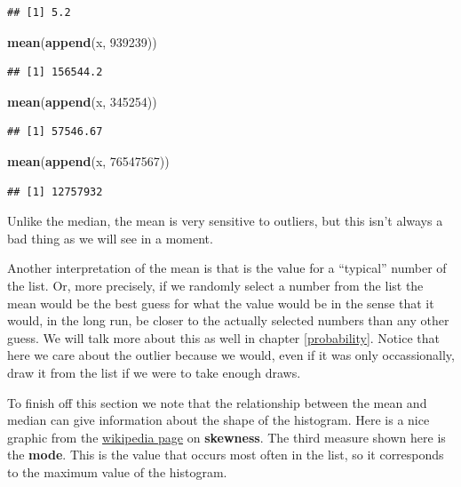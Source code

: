 \documentclass[]{book}
\newenvironment{Shaded}{\begin{snugshade}}{\end{snugshade}}
\newcommand{\DecValTok}[1]{\textcolor[rgb]{0.00,0.00,0.81}{#1}}
\newcommand{\KeywordTok}[1]{\textcolor[rgb]{0.13,0.29,0.53}{\textbf{#1}}}
\newcommand{\NormalTok}[1]{#1}
\begin{document}
\begin{verbatim}
## [1] 5.2
\end{verbatim}

\begin{Shaded}
\begin{Highlighting}[]
\KeywordTok{mean}\NormalTok{(}\KeywordTok{append}\NormalTok{(x, }\DecValTok{939239}\NormalTok{))}
\end{Highlighting}
\end{Shaded}

\begin{verbatim}
## [1] 156544.2
\end{verbatim}

\begin{Shaded}
\begin{Highlighting}[]
\KeywordTok{mean}\NormalTok{(}\KeywordTok{append}\NormalTok{(x, }\DecValTok{345254}\NormalTok{))}
\end{Highlighting}
\end{Shaded}

\begin{verbatim}
## [1] 57546.67
\end{verbatim}

\begin{Shaded}
\begin{Highlighting}[]
\KeywordTok{mean}\NormalTok{(}\KeywordTok{append}\NormalTok{(x, }\DecValTok{76547567}\NormalTok{))}
\end{Highlighting}
\end{Shaded}

\begin{verbatim}
## [1] 12757932
\end{verbatim}

Unlike the median, the mean is very sensitive to outliers, but this isn't always a bad thing as we will see in a moment.

Another interpretation of the mean is that is the value for a ``typical'' number of the list. Or, more precisely, if we randomly select a number from the list the mean would be the best guess for what the value would be in the sense that it would, in the long run, be closer to the actually selected numbers than any other guess. We will talk more about this as well in chapter \ref{probability}. Notice that here we care about the outlier because we would, even if it was only occassionally, draw it from the list if we were to take enough draws.

To finish off this section we note that the relationship between the mean and median can give information about the shape of the histogram. Here is a nice graphic from the \href{https://en.wikipedia.org/wiki/Skewness}{wikipedia page} on \textbf{skewness}.
The third measure shown here is the \textbf{mode}. This is the value that occurs most often in the list, so it corresponds to the maximum value of the histogram.
\end{document}
